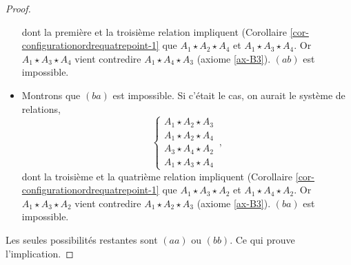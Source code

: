\begin{cor}
\begin{proof}
\begin{itemize}[$\bullet$]
            dont la première et la troisième relation impliquent (Corollaire \ref{cor-configurationordrequatrepoint-1} que $A_1 \star A_2 \star A_4$ et $A_1 \star A_3 \star A_4$. Or $A_1 \star A_3 \star A_4$ vient contredire $A_1 \star A_4 \star A_3$ (axiome \ref{ax-B3}). $(ab)$ est impossible.
            \item Montrons que $(ba)$ est impossible. Si c'était le cas, on aurait le système de relations,
            \begin{equation*}
                \left\{\begin{array}{cc}
                     A_1 \star A_2 \star A_3  \\
                     A_1 \star A_2 \star A_4  \\
                     A_3 \star A_4 \star A_2 \\
                     A_1 \star A_3 \star A_4
                \end{array}\right.\,,
            \end{equation*}
            dont la troisième et la quatrième relation impliquent (Corollaire \ref{cor-configurationordrequatrepoint-1} que $A_1 \star A_3 \star A_2$ et $A_1 \star A_4 \star A_2$. Or $A_1 \star A_3 \star A_2$ vient contredire $A_1 \star A_2 \star A_3$ (axiome \ref{ax-B3}). $(ba)$ est impossible.
        \end{itemize}
        Les seules possibilités restantes sont $(aa)$ ou $(bb)$. Ce qui prouve l'implication.
    \end{proof}
\end{cor}

